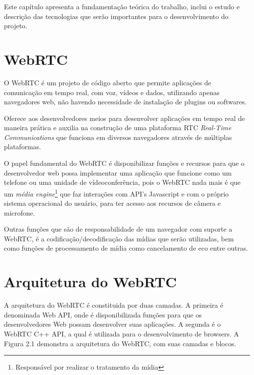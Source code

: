 \documentclass[ruledheader]{abnt} %
\begin{document}
Este capítulo apresenta a fundamentação teórica do trabalho, inclui o estudo e descrição das tecnologias que serão importantes para o desenvolvimento do projeto. 

\section{WebRTC}
\label{c_webRtc} 


O WebRTC é um projeto de código aberto que permite aplicações de comunicação em tempo real, com voz, vídeos e dados, utilizando apenas navegadores web, não havendo necessidade de instalação de plugins ou softwares.

Oferece aos desenvolvedores meios para desenvolver aplicações em tempo real de maneira prática e auxilia na construção de uma plataforma RTC \textit{Real-Time Communications} que funciona em diversos navegadores através de múltiplas plataformas.

O papel fundamental do WebRTC é disponibilizar funções e recursos para que o desenvolvedor web possa implementar uma aplicação que funcione como um telefone ou uma unidade de vídeoconferência, pois o WebRTC nada mais é que um \textit{média engine}\footnote{Responsável por realizar o tratamento da mídia} que faz interações com API's Javascript e com o próprio sistema operacional do usuário, para ter acesso aos recursos de câmera e microfone.

Outras funções que são de responsabilidade de um navegador com suporte a WebRTC, é a codificação/decodificação das mídias que serão utilizadas, bem como funções de processamento de mídia como cancelamento de eco entre outras.

\section{Arquitetura do WebRTC}
\label{s_webRtc}
A arquitetura do WebRTC é constituida por duas camadas. A primeira é denominada Web API, onde é disponibilizada funções para que os desenvolvedores Web possam desenvolver suas aplicações. A segunda é o WebRTC C++ API, a qual é utilizada para o desenvolvimento de browsers. A Figura 2.1 demonstra a arquitetura do WebRTC, com suas camadas e blocos.
\end{document}
